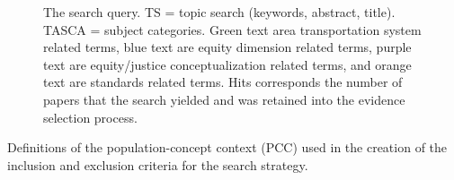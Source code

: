 \documentclass[
  letterpaper,
  DIV=11,
  numbers=noendperiod]{scrartcl}
\begin{document}
\begin{figure}


\caption{\label{fig-figA2}The search query. TS = topic search (keywords,
abstract, title). TASCA = subject categories. Green text area
transportation system related terms, blue text are equity dimension
related terms, purple text are equity/justice conceptualization related
terms, and orange text are standards related terms. Hits corresponds the
number of papers that the search yielded and was retained into the
evidence selection process.}

\end{figure}%

Definitions of the population-concept context (PCC) used in the creation
of the inclusion and exclusion criteria for the search strategy.
\end{document}
